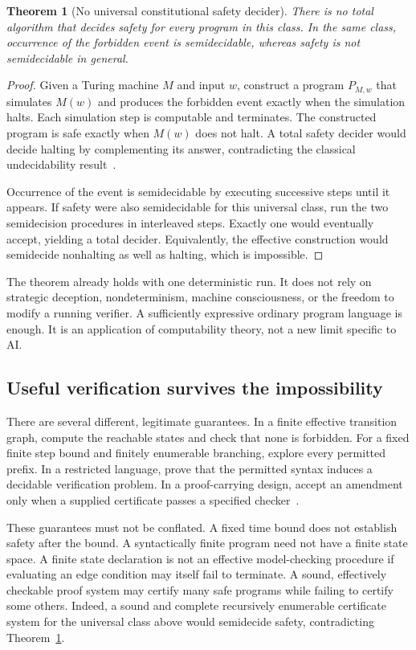 \documentclass[11pt,letterpaper]{article}
\theoremstyle{plain}
\newtheorem{theorem}[proposition]{Theorem}
\theoremstyle{definition}
\theoremstyle{remark}
\begin{document}
\begin{theorem}[No universal constitutional safety decider]\label{thm:undecidable}
There is no total algorithm that decides safety for every program in this class. In the same class, occurrence of the forbidden event is semidecidable, whereas safety is not semidecidable in general.
\end{theorem}
\begin{proof}
Given a Turing machine $M$ and input $w$, construct a program $P_{M,w}$ that simulates $M(w)$ and produces the forbidden event exactly when the simulation halts. Each simulation step is computable and terminates. The constructed program is safe exactly when $M(w)$ does not halt. A total safety decider would decide halting by complementing its answer, contradicting the classical undecidability result~\cite{turing}.

Occurrence of the event is semidecidable by executing successive steps until it appears. If safety were also semidecidable for this universal class, run the two semidecision procedures in interleaved steps. Exactly one would eventually accept, yielding a total decider. Equivalently, the effective construction would semidecide nonhalting as well as halting, which is impossible.
\end{proof}

The theorem already holds with one deterministic run. It does not rely on strategic deception, nondeterminism, machine consciousness, or the freedom to modify a running verifier. A sufficiently expressive ordinary program language is enough. It is an application of computability theory, not a new limit specific to AI.

\subsection{Useful verification survives the impossibility}
There are several different, legitimate guarantees. In a finite effective transition graph, compute the reachable states and check that none is forbidden. For a fixed finite step bound and finitely enumerable branching, explore every permitted prefix. In a restricted language, prove that the permitted syntax induces a decidable verification problem. In a proof-carrying design, accept an amendment only when a supplied certificate passes a specified checker~\cite{necula}.

These guarantees must not be conflated. A fixed time bound does not establish safety after the bound. A syntactically finite program need not have a finite state space. A finite state declaration is not an effective model-checking procedure if evaluating an edge condition may itself fail to terminate. A sound, effectively checkable proof system may certify many safe programs while failing to certify some others. Indeed, a sound and complete recursively enumerable certificate system for the universal class above would semidecide safety, contradicting Theorem~\ref{thm:undecidable}.
\end{document}
